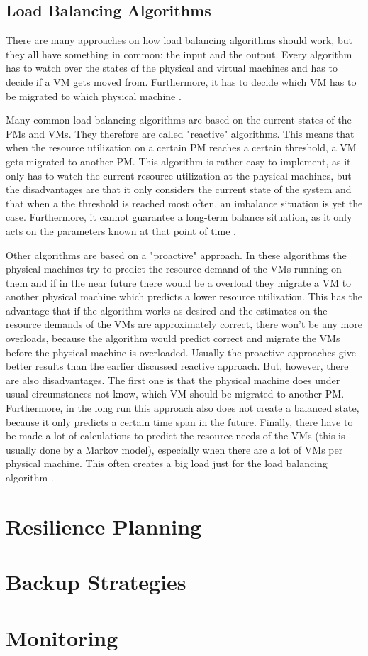 \subsection{Load Balancing Algorithms}
There are many approaches on how load balancing algorithms should work, but they all have something in common: the input and the output. Every algorithm has to watch over the states of the physical and virtual machines and has to decide if a VM gets moved from. Furthermore, it has to decide which VM has to be migrated to which physical machine \cite{Chen_2014}.

Many common load balancing algorithms are based on the current states of the PMs and VMs. They therefore are called "reactive" algorithms. This means that when the resource utilization on a certain PM reaches a certain threshold, a VM gets migrated to another PM. This algorithm is rather easy to implement, as it only has to watch the current resource utilization at the physical machines, but the disadvantages are that it only considers the current state of the system and that when a the threshold is reached most often, an imbalance situation is yet the case. Furthermore, it cannot guarantee a long-term balance situation, as it only acts on the parameters known at that point of time \cite{Arzuaga_2010,Chen_2014}.

Other algorithms are based on a "proactive" approach. In these algorithms the physical machines try to predict the resource demand of the VMs running on them and if in the near future there would be a overload they migrate a VM to another physical machine which predicts a lower resource utilization. This has the advantage that if the algorithm works as desired and the estimates on the resource demands of the VMs are approximately correct, there won't be any more overloads, because the algorithm would predict correct and migrate the VMs before the physical machine is overloaded. Usually the proactive approaches give better results than the earlier discussed reactive approach. But, however, there are also disadvantages. The first one is that the physical machine does under usual circumstances not know, which VM should be migrated to another PM. Furthermore, in the long run this approach also does not create a balanced state, because it only predicts a certain time span in the future. Finally, there have to be made a lot of calculations to predict the resource needs of the VMs (this is usually done by a Markov model), especially when there are a lot of VMs per physical machine. This often creates a big load just for the load balancing algorithm \cite{Beloglazov_2013,Chen_2014}.

\section{Resilience Planning}

\section{Backup Strategies}

\section{Monitoring}